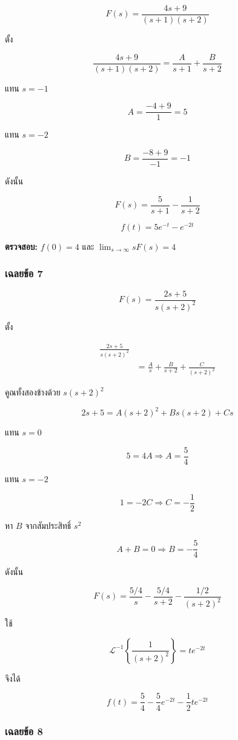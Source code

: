 \[
F(s)=\frac{4s+9}{(s+1)(s+2)}
\]

ตั้ง

\[
\frac{4s+9}{(s+1)(s+2)}=\frac{A}{s+1}+\frac{B}{s+2}
\]

แทน $s=-1$

\[
A=\frac{-4+9}{1}=5
\]

แทน $s=-2$

\[
B=\frac{-8+9}{-1}=-1
\]

ดังนั้น

\[
F(s)=\frac{5}{s+1}-\frac{1}{s+2}
\]

\[
\boxed{f(t)=5e^{-t}-e^{-2t}}
\]

\textbf{ตรวจสอบ:} $f(0)=4$ และ $\lim_{s\to\infty}sF(s)=4$

\subsubsection{เฉลยข้อ 7}

\[
F(s)=\frac{2s+5}{s(s+2)^2}
\]

ตั้ง

\[
\begin{aligned}
    \frac{2s+5}{s(s+2)^2}&\\
    &=\frac{A}{s}+\frac{B}{s+2}+\frac{C}{(s+2)^2}
\end{aligned}
\]

คูณทั้งสองข้างด้วย $s(s+2)^2$

\[
2s+5=A(s+2)^2+Bs(s+2)+Cs
\]

แทน $s=0$

\[
5=4A\Rightarrow A=\frac{5}{4}
\]

แทน $s=-2$

\[
1=-2C\Rightarrow C=-\frac{1}{2}
\]

หา $B$ จากสัมประสิทธิ์ $s^2$

\[
A+B=0\Rightarrow B=-\frac{5}{4}
\]

ดังนั้น

\[
F(s)=\frac{5/4}{s}-\frac{5/4}{s+2}-\frac{1/2}{(s+2)^2}
\]

ใช้

\[
\mathcal{L}^{-1}\left\{\frac{1}{(s+2)^2}\right\}=te^{-2t}
\]

จึงได้

\[
\boxed{f(t)=\frac{5}{4}-\frac{5}{4}e^{-2t}-\frac{1}{2}te^{-2t}}
\]

\subsubsection{เฉลยข้อ 8}

